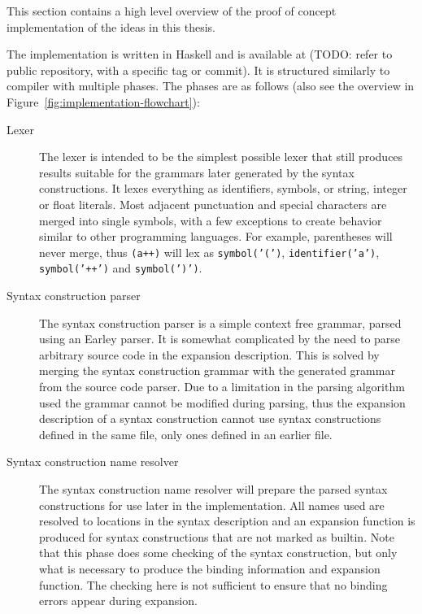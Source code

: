 \documentclass{kththesis}
\begin{document}
This section contains a high level overview of the proof of concept implementation of the ideas in this thesis.

The implementation is written in Haskell and is available at (TODO: refer to public repository, with a specific tag or commit). It is structured similarly to compiler with multiple phases. The phases are as follows (also see the overview in Figure~\ref{fig:implementation-flowchart}):

\begin{description}
  \item[Lexer] The lexer is intended to be the simplest possible lexer that still produces results suitable for the grammars later generated by the syntax constructions. It lexes everything as identifiers, symbols, or string, integer or float literals. Most adjacent punctuation and special characters are merged into single symbols, with a few exceptions to create behavior similar to other programming languages. For example, parentheses will never merge, thus \texttt{(a++)} will lex as \texttt{symbol('(')}, \texttt{identifier('a')}, \texttt{symbol('++')} and \texttt{symbol(')')}.

  \item[Syntax construction parser] The syntax construction parser is a simple context free grammar, parsed using an Earley \cite{Earley1970An-Efficient-Co} parser. It is somewhat complicated by the need to parse arbitrary source code in the expansion description. This is solved by merging the syntax construction grammar with the generated grammar from the source code parser. Due to a limitation in the parsing algorithm used the grammar cannot be modified during parsing, thus the expansion description of a syntax construction cannot use syntax constructions defined in the same file, only ones defined in an earlier file.

  \item[Syntax construction name resolver] The syntax construction name resolver will prepare the parsed syntax constructions for use later in the implementation. All names used are resolved to locations in the syntax description and an expansion function is produced for syntax constructions that are not marked as builtin. Note that this phase does some checking of the syntax construction, but only what is necessary to produce the binding information and expansion function. The checking here is not sufficient to ensure that no binding errors appear during expansion.


\end{description}
\end{document}
